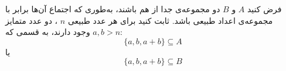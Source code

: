 \EXERCISE
فرض کنید
$A$
و
$B$
دو مجموعه‌ی جدا از هم باشند، به‌طوری که اجتماع آن‌ها برابر با مجموعه‌ی اعداد طبیعی باشد. ثابت کنید برای هر عدد طبیعی
$n$
، دو عدد متمایز
$a, b > n$
وجود دارند، به قسمی که:
$$\{a, b, a + b\} \subseteq A$$
یا
$$\{a, b, a + b\} \subseteq B$$